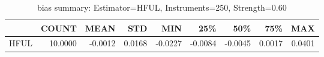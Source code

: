\begin{table}[ht]
\centering
\caption{bias summary: Estimator=HFUL, Instruments=250, Strength=0.60}
\begin{tabular}{lrrrrrrrr}
\toprule
 & COUNT & MEAN & STD & MIN & 25\% & 50\% & 75\% & MAX \\
\midrule
HFUL & 10.0000 & -0.0012 & 0.0168 & -0.0227 & -0.0084 & -0.0045 & 0.0017 & 0.0401 \\
\bottomrule
\end{tabular}
\end{table}
